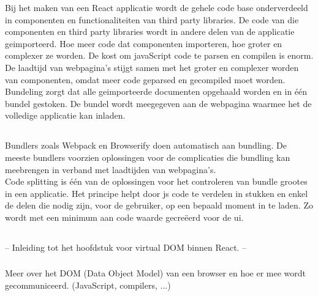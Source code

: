 Bij het maken van een React applicatie wordt de gehele code base onderverdeeld in componenten en functionaliteiten van third party libraries. De code van die componenten en third party libraries wordt in andere delen van de applicatie geimporteerd. Hoe meer code dat componenten importeren, hoe groter en complexer ze worden. De kost om javaScript code te parsen en compilen is enorm. De laadtijd van webpagina's stijgt samen met het groter en complexer worden van componenten, omdat meer code geparsed en gecompiled moet worden.\\
Bundeling zorgt dat alle geimporteerde documenten opgehaald worden en in één bundel gestoken. De bundel wordt meegegeven aan de webpagina waarmee het de volledige applicatie kan inladen.  

\subsection{}
\label{sec:codeSplitting}

Bundlers zoals Webpack en Browserify doen automatisch aan bundling. De meeste bundlers voorzien oplossingen voor de complicaties die bundling kan meebrengen in verband met laadtijden van webpagina's.\\
Code splitting is één van de oplossingen voor het controleren van bundle grootes in een applicatie. Het principe helpt door \gls{js} code te verdelen in stukken en enkel de delen die nodig zijn, voor de gebruiker, op een bepaald moment in te laden. Zo wordt met een minimum aan code waarde gecreëerd voor de \gls{ui}.\\




\subsection{}
\label{ch:reactVirtualDOM}

-- Inleiding tot het hoofdstuk voor virtual DOM binnen React. --

\subsubsection{}
\label{sec:watIsDOM}

Meer over het DOM (Data Object Model) van een browser en hoe er mee wordt gecommuniceerd. (JavaScript, compilers, ...)

